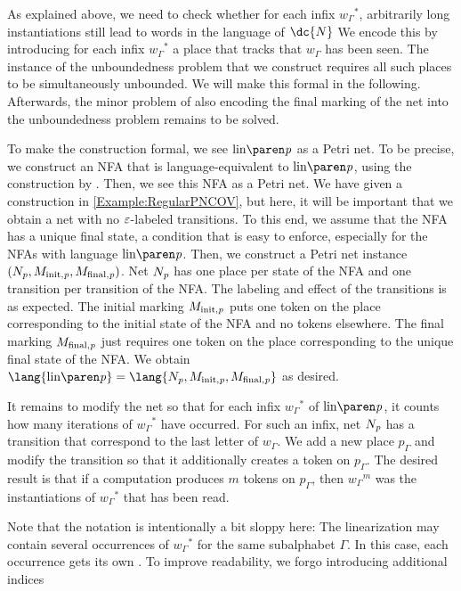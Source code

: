 \documentclass[../../diss.tex]{subfiles}
\begin{document}
As explained above, we need to check whether for each infix ${w_\Gamma}^*$, arbitrarily long instantiations still lead to words in the language of $\dc{N}$
We encode this by introducing for each infix ${w_\Gamma}^*$ a place that tracks that $w_\Gamma$ has been seen.
The instance of the unboundedness problem that we construct requires all such places to be simultaneously unbounded.
We will make this formal in the following.
Afterwards, the minor problem of also encoding the final marking of the net into the unboundedness problem remains to be solved.

To make the construction formal, we see $\linof{\product}$ as a Petri net.
To be precise, we construct an NFA that is language-equivalent to $\linof{\product}$, \eg using the construction by .
Then, we see this NFA as a Petri net.
We have given a construction in \cref{Example:RegularPNCOV}, but here, it will be important that we obtain a net with no $\varepsilon$-labeled transitions.
To this end, we assume that the NFA has a unique final state, a condition that is easy to enforce, especially for the NFAs with language $\linof{\product}$.
Then, we construct a Petri net instance $(N_{\mathit{p}},M_{{\text{init}},\mathit{p}},M_{{\text{final}},\mathit{p}})$.
Net $N_{\mathit{p}}$ has one place per state of the NFA and one transition per transition of the NFA.\@
The labeling and effect of the transitions is as expected.
The initial marking $M_{{\text{init}},\mathit{p}}$ puts one token on the place corresponding to the initial state of the NFA and no tokens elsewhere.
The final marking $M_{{\text{final}},\mathit{p}}$ just requires one token on the place corresponding to the unique final state of the NFA.
We obtain $\lang{\linof{\product}} = \lang{N_\product,M_{\init,\product},M_{\final,\product}}$ as desired.

It remains to modify the net so that for each infix ${w_\Gamma}^*$ of $\linof{\product}$, it counts how many iterations of ${w_\Gamma}^*$ have occurred.
For such an infix, net $N_{\mathit{p}}$ has a transition that correspond to the last letter of $w_\Gamma$.
We add a new place $p_\Gamma$ and modify the transition so that it additionally creates a token on $p_\Gamma$.
The desired result is that if a computation produces $m$ tokens on $p_\Gamma$, then ${w_\Gamma}^m$ was the instantiations of ${w_\Gamma}^*$ that has been read.

Note that the notation is intentionally a bit sloppy here:
The linearization may contain several occurrences of ${w_\Gamma}^*$ for the same subalphabet $\Gamma$.
In this case, each occurrence gets its own .
To improve readability, we forgo introducing additional indices
\end{document}
